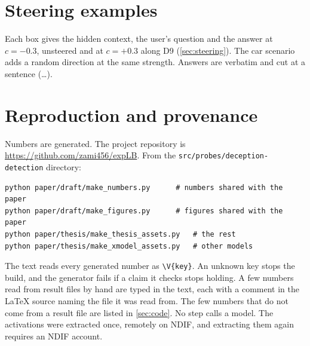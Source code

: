 \FloatBarrier
\section*{Steering examples}
\label{sec:steering-examples}

Each box gives the hidden context, the user's question and the answer at $c = -0.3$, unsteered and at
$c = +0.3$ along D9 (\cref{sec:steering}). The car scenario adds a random direction at the same
strength. Answers are verbatim and cut at a sentence (\ldots).



\section*{Reproduction and provenance}

Numbers are generated. The project repository is \url{https://github.com/zami456/expLB}. From the
\texttt{src/\allowbreak probes/\allowbreak deception-detection} directory:
\begin{verbatim}
python paper/draft/make_numbers.py      # numbers shared with the paper
python paper/draft/make_figures.py      # figures shared with the paper
python paper/thesis/make_thesis_assets.py   # the rest
python paper/thesis/make_xmodel_assets.py   # other models
\end{verbatim}
The text reads every generated number as \verb|\V{key}|. An unknown key stops the build, and the
generator fails if a claim it checks stops holding. A few numbers read from result files by hand are
typed in the text, each with a comment in the \LaTeX{} source naming the file it was read from. The
few numbers that do not come from a result file are listed in \cref{sec:code}. No step calls a
model. The activations were extracted once, remotely on NDIF, and extracting them again requires an
NDIF account.
